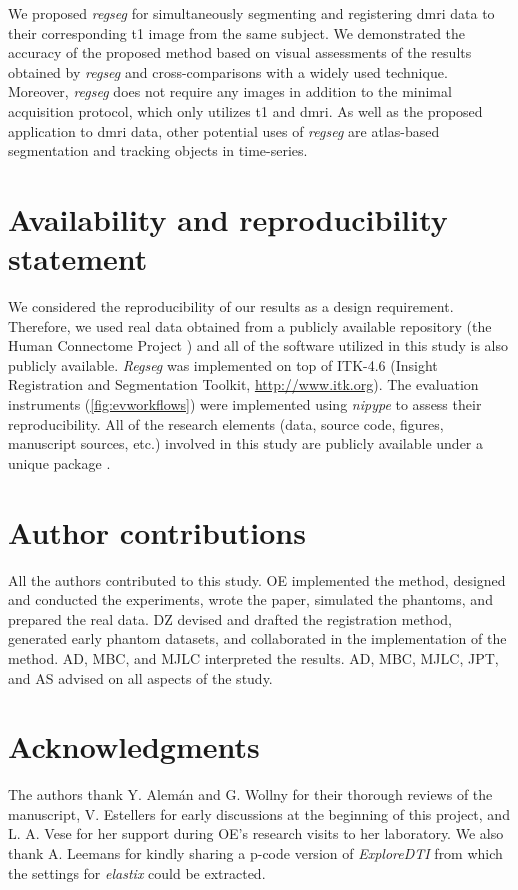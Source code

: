 \documentclass[3p,authoryear,fleqn]{elsarticle}
\providecommand{\regseg}{\emph{regseg}}
\providecommand{\Regseg}{\emph{Regseg}}
\begin{document}
We proposed \regseg{} for simultaneously segmenting and registering \gls*{dmri} data to
  their corresponding \gls*{t1} image from the same subject.
We demonstrated the accuracy of the proposed method based on visual assessments of the results
  obtained by \regseg{} and cross-comparisons with a widely used technique.
Moreover, \regseg{} does not require any images in addition to the minimal acquisition protocol,
  which only utilizes \gls*{t1} and \gls*{dmri}.
As well as the proposed application to \gls*{dmri} data, other potential uses of \regseg{} are
  atlas-based segmentation and tracking objects in time-series.


\section*{Availability and reproducibility statement}
\label{sec:availability}
We considered the reproducibility of our results as a design requirement.
Therefore, we used real data obtained from a publicly available repository
  (the Human Connectome Project \citep{essen_human_2012}) and all of the software
  utilized in this study is also publicly available.
\Regseg{} was implemented on top of ITK-4.6 (Insight Registration and 
  Segmentation Toolkit, \url{http://www.itk.org}).
The evaluation instruments (\autoref{fig:evworkflows}) were implemented using
  \emph{nipype} \citep{gorgolewski_nipype_2011} to assess their reproducibility.
All of the research elements (data, source code, figures, manuscript sources, etc.) involved in this study
  are publicly available under a unique package \citep{esteban_acweregistration_2015}.  

\makeatletter{}\section*{Author contributions}
All the authors contributed to this study.
OE implemented the method, designed and conducted the experiments, wrote the paper,
  simulated the phantoms, and prepared the real data.
DZ devised and drafted the registration method, generated early phantom datasets, and
  collaborated in the implementation of the method.
AD, MBC, and MJLC interpreted the results.
AD, MBC, MJLC, JPT, and AS advised on all aspects of the study.

\section*{Acknowledgments}
The authors thank Y. Alem\'an and G. Wollny for their thorough reviews of the manuscript,
  V. Estellers for early discussions at the beginning of this project,
  and L. A. Vese for her support during OE's research visits to her laboratory.
We also thank A. Leemans for kindly sharing a p-code version of \emph{ExploreDTI} from
  which the settings for \emph{elastix} could be extracted.
\end{document}
